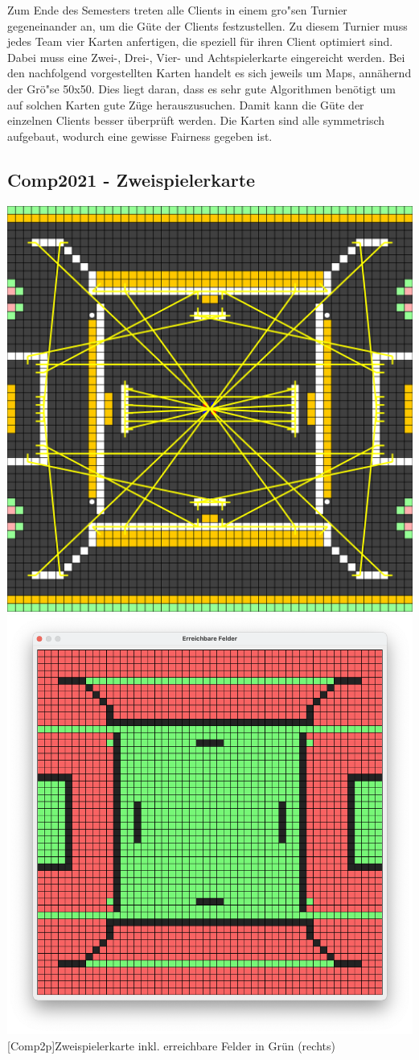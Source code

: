 Zum Ende des Semesters treten alle Clients in einem gro"sen Turnier gegeneinander an, um die G\"ute der Clients festzustellen.
Zu diesem Turnier muss jedes Team vier Karten anfertigen, die speziell f\"ur ihren Client optimiert sind.
Dabei muss eine Zwei-, Drei-, Vier- und Achtspielerkarte eingereicht werden.
Bei den nachfolgend vorgestellten Karten handelt es sich jeweils um Maps, ann\"ahernd der Gr\"o"se 50x50.
Dies liegt daran, dass es sehr gute Algorithmen ben\"otigt um auf solchen Karten gute Z\"uge herauszusuchen.
Damit kann die G\"ute der einzelnen Clients besser \"uberpr\"uft werden.
Die Karten sind alle symmetrisch aufgebaut, wodurch eine gewisse Fairness gegeben ist.

\subsection{Comp2021 - Zweispielerkarte}\label{subsec:comp2021-2p}

\vspace{1em}
\begin{minipage}{\linewidth}
    \centering
    \includegraphics[width=0.49\linewidth]{pics/maps/comp2021_01_2p}
    \includegraphics[width=0.48\linewidth]{pics/maps/field2021_01_2p}
    [Comp2p]{Zweispielerkarte inkl. erreichbare Felder in Gr\"un (rechts)}
    \label{fig:comp-2p}
\end{minipage}
\vspace{1em}

